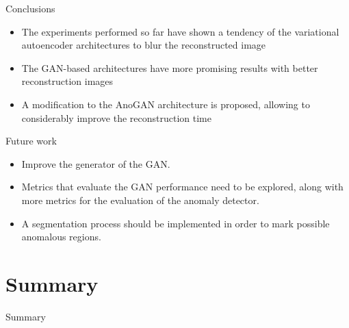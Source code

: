 \documentclass[15pt]{beamer} %
\begin{document}
\begin{frame}{Conclusions}
  
  \begin{itemize}
  \item The experiments performed so far have shown a tendency of the variational autoencoder
architectures to blur the reconstructed image
  \item  The GAN-based architectures have more
promising results with better reconstruction images
  \item A modification to the AnoGAN architecture is proposed, allowing to considerably improve
the reconstruction time
  \end{itemize}
  
\end{frame}

\begin{frame}{Future work}
  
  \begin{itemize}
  \item Improve the generator of the GAN.
  \item Metrics that evaluate the GAN performance need to be explored, along with more metrics for the evaluation of the anomaly detector.
  \item A segmentation process should be implemented in order to mark possible anomalous regions.
  \end{itemize}
  
\end{frame}


\section{Summary}

\begin{frame}{Summary}
  \tableofcontents
\end{frame}
\end{document}
